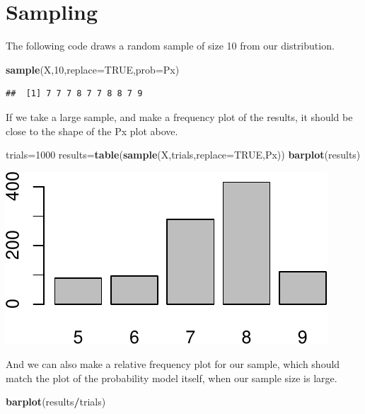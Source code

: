 \documentclass[
]{book}
\newenvironment{Shaded}{\begin{snugshade}}{\end{snugshade}}
\newcommand{\AttributeTok}[1]{\textcolor[rgb]{0.13,0.29,0.53}{#1}}
\newcommand{\ConstantTok}[1]{\textcolor[rgb]{0.56,0.35,0.01}{#1}}
\newcommand{\DecValTok}[1]{\textcolor[rgb]{0.00,0.00,0.81}{#1}}
\newcommand{\FunctionTok}[1]{\textcolor[rgb]{0.13,0.29,0.53}{\textbf{#1}}}
\newcommand{\NormalTok}[1]{#1}
\newcommand{\OtherTok}[1]{\textcolor[rgb]{0.56,0.35,0.01}{#1}}
\newcommand{\SpecialCharTok}[1]{\textcolor[rgb]{0.81,0.36,0.00}{\textbf{#1}}}
\theoremstyle{definition}
\theoremstyle{definition}
\theoremstyle{definition}
\theoremstyle{definition}
\theoremstyle{remark}
\begin{document}
\section{Sampling}\label{sampling}

The following code draws a random sample of size 10 from our distribution.

\begin{Shaded}
\begin{Highlighting}[]
\FunctionTok{sample}\NormalTok{(X,}\DecValTok{10}\NormalTok{,}\AttributeTok{replace=}\ConstantTok{TRUE}\NormalTok{,}\AttributeTok{prob=}\NormalTok{Px)}
\end{Highlighting}
\end{Shaded}

\begin{verbatim}
##  [1] 7 7 7 8 7 7 8 8 7 9
\end{verbatim}

If we take a large sample, and make a frequency plot of the results, it should be close to the shape of the Px plot above.

\begin{Shaded}
\begin{Highlighting}[]
\NormalTok{trials}\OtherTok{=}\DecValTok{1000}
\NormalTok{results}\OtherTok{=}\FunctionTok{table}\NormalTok{(}\FunctionTok{sample}\NormalTok{(X,trials,}\AttributeTok{replace=}\ConstantTok{TRUE}\NormalTok{,Px))}
\FunctionTok{barplot}\NormalTok{(results)}
\end{Highlighting}
\end{Shaded}

\includegraphics{math340-notes_files/figure-latex/unnamed-chunk-135-1.pdf}

And we can also make a relative frequency plot for our sample, which should match the plot of the probability model itself, when our sample size is large.

\begin{Shaded}
\begin{Highlighting}[]
\FunctionTok{barplot}\NormalTok{(results}\SpecialCharTok{/}\NormalTok{trials)}
\end{Highlighting}
\end{Shaded}
\end{document}
